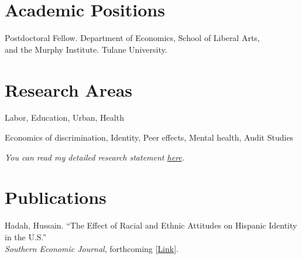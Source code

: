 \documentclass[letterpaper]{article}
\renewenvironment{itemize}{
  \begin{list}{}{
    \setlength{\leftmargin}{1.5em}
  }
}{
  \end{list}
}
\begin{document}
\section*{Academic Positions}
\vspace{2 mm}
\begin{itemize}
  \item {} Postdoctoral Fellow. Department of Economics, School of Liberal Arts, \\{\makebox[1.8cm]{\hfill}} and the Murphy Institute. Tulane University.
\end{itemize}
\vspace{2 mm}

\section*{Research Areas}
\vspace{2 mm}
\begin{itemize}
\item {} Labor, Education, Urban, Health
\item {} Economics of discrimination, Identity, Peer effects, Mental health, Audit Studies
\item \textit{You can read my detailed research statement \href{https://hhadah.github.io/statements/Hadah_Research.pdf}{here}.}
\end{itemize}
\vspace{2 mm}

\section*{Publications}
\vspace{2 mm}
\begin{itemize}
    \item Hadah, Hussain. ``The Effect of Racial and Ethnic Attitudes on Hispanic Identity in the U.S.'' \\ 
    \makebox[4mm]{} \textit{Southern Economic Journal}, forthcoming [\href{https://dx.doi.org/10.2139/ssrn.4566232}{Link}].
\end{itemize}
\vspace{2 mm}
\end{document}
